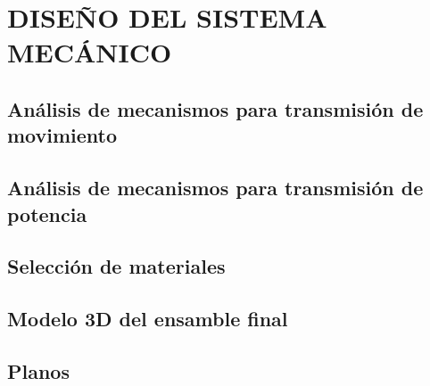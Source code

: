 \chapter{\MakeUppercase{Diseño del Sistema Mecánico}} \label{me_design}
\thispagestyle{mainmatterstyle} %
\section{Análisis de mecanismos para transmisión de movimiento}
\section{Análisis de mecanismos para transmisión de potencia}
\section{Selección de materiales}
\section{Modelo 3D del ensamble final}
\section{Planos}
